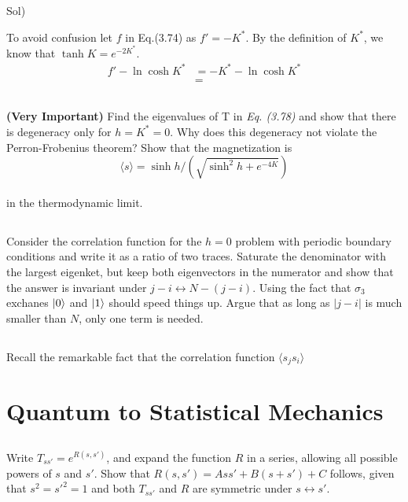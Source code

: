 \documentclass[paper=a4, fontsize=11pt]{scrartcl}
\numberwithin{equation}{section}
\numberwithin{figure}{section}
\numberwithin{table}{section}
\newcommand{\expval}[1]{\langle #1 \rangle}
\newenvironment{problem}{\subsection{}}{}
\newenvironment{solution}{Sol) \begin{adjustwidth}{0.2in}{}\vspace{0.1in}}{\end{adjustwidth}}
\begin{document}
\begin{solution}
	To avoid confusion let $f$ in Eq.(3.74) as $f'=-K^*$. By the definition of $K^*$, we know that $\tanh K = e^{-2K^*}$.\\[3pt]
	\begin{equation}
	\begin{split}
	f'-\ln \cosh K^* &= -K^* - \ln \cosh K^* \\
	&= 
	\end{split}
	\end{equation}
\end{solution}
\vskip 0.3in

\begin{problem}
	\textbf{(Very Important)} Find the eigenvalues of T in \textit{Eq. (3.78)} and show that there is degeneracy only for $h=K^*=0$. Why does this degeneracy not violate the Perron-Frobenius theorem? Show that the magnetization is \\[3pt]
	\begin{equation}
		\expval{s} = \sinh{h}/\left(\sqrt{\sinh^2 h + e^{-4K}}\right)
		\nonumber
	\end{equation}\\
	in the thermodynamic limit.
\end{problem}
\vskip 0.3in

\begin{problem}
	Consider the correlation function for the $h=0$ problem with periodic boundary conditions and write it as a ratio of two traces. Saturate the denominator with the largest eigenket, but keep both eigenvectors in the numerator and show that the answer is invariant under $j-i \leftrightarrow N-\left(j-i\right)$. Using the fact that $\sigma_3$ exchanes $\ket{0}$ and $\ket{1}$ should speed things up. Argue that as long as $|j-i|$ is much smaller than $N$, only one term is needed.
\end{problem}
\vskip 0.3in

\begin{problem}
	Recall the remarkable fact that the correlation function $\expval{s_j s_i}$
\end{problem}
\vskip 0.3in

\section{Quantum to Statistical Mechanics}

\begin{problem}
	Write $T_{ss'}=e^{R(s,s')}$, and expand the function $R$ in a series, allowing all possible powers of $s$ and $s'$. Show that $R(s,s')=Ass'+B(s+s')+C$ follows, given that $s^2 = s'^2 =1$ and both $T_{ss'}$ and $R$ are symmetric under $s\leftrightarrow s'$.
\end{problem}
\vskip 0.3in
\end{document}
